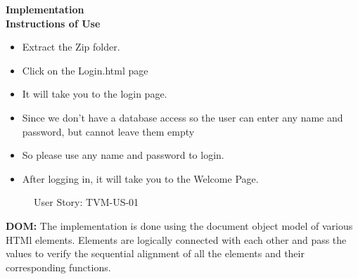 \documentclass[a4paper,12pt]{report}
\begin{document}
\begin{flushleft}
	\textbf{Implementation} \\
	
	\vspace{0.5cm}
	\textbf{Instructions of Use}
	\begin{itemize}
		\item Extract the Zip folder.
		\item Click on the Login.html page
		\item It will take you to the login page.
		\item Since we don’t have a database access so the user can enter any name and password, but cannot leave them empty
		\item So please use any name and password to login.
		\item After logging in, it will take you to the Welcome Page.
	\end{itemize}
	
	\begin{figure}[!htb]
		\caption{\label{fig:tvm01}User Story: TVM-US-01}	
	\end{figure}
	
	\vspace{0.5cm}
	\textbf{DOM:} The implementation is done using the document object model of various HTMl elements. Elements are logically connected with each other and pass the values to verify the sequential alignment of all the elements and their corresponding functions.\\
	

\end{flushleft}
\end{document}
